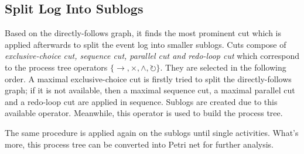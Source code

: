 \subsection{Split Log Into Sublogs}
Based on the directly-follows graph, it finds the most prominent cut which is applied afterwards to split the event log into smaller sublogs. Cuts compose of \emph{exclusive-choice cut, sequence cut, parallel cut and redo-loop cut} which correspond to the process tree operators $ \{\rightarrow, \times, \land, \circlearrowright \}$. They are selected in the following order. A maximal exclusive-choice cut is firstly tried to split the directly-follows graph; if it is not available, then a maximal sequence cut, a  maximal parallel cut and a redo-loop cut are applied in sequence. Sublogs are created due to this available operator. Meanwhile, this operator is used to build the process tree. 

The same procedure is applied again on the sublogs until single activities. What's more, this process tree can be converted into Petri net for further analysis. 